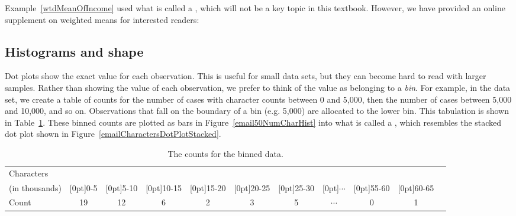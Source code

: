 Example~\ref{wtdMeanOfIncome} used what is called a , which will not be a key topic in this textbook. However, we have provided an online supplement on weighted means for interested readers:
\begin{center}
\end{center}

\subsection{Histograms and shape}
\label{histogramsAndShape}

Dot plots show the exact value for each observation. This is useful for small data sets, but they can become hard to read with larger samples. Rather than showing the value of each observation, we prefer to think of the value as belonging to a \emph{bin}. For example, in the  data set, we create a table of counts for the number of cases with character counts between 0 and 5,000, then the number of cases between 5,000 and 10,000, and so on. Observations that fall on the boundary of a bin (e.g. 5,000) are allocated to the lower bin. This tabulation is shown in Table~\ref{binnedNumCharTable}. These binned counts are plotted as bars in Figure~\ref{email50NumCharHist} into what is called a , which resembles the stacked dot plot shown in Figure~\ref{emailCharactersDotPlotStacked}.

\begin{table}[ht]
\centering\small
\begin{tabular}{l ccc ccc ccc c}
  \hline
Characters & \\
(in thousands) & \raisebox{1.5ex}[0pt]{0-5} & \raisebox{1.5ex}[0pt]{5-10} & \raisebox{1.5ex}[0pt]{10-15} & \raisebox{1.5ex}[0pt]{15-20} & \raisebox{1.5ex}[0pt]{20-25} & \raisebox{1.5ex}[0pt]{25-30} & \raisebox{1.5ex}[0pt]{$\cdots$} & \raisebox{1.5ex}[0pt]{55-60} & \raisebox{1.5ex}[0pt]{60-65} \\
  \hline
Count & 19 & 12 & 6 & 2 & 3 & 5 & $\cdots$ & 0 & 1 \\
  \hline
\end{tabular}
\caption{The counts for the binned  data.}
\label{binnedNumCharTable}
\end{table}

